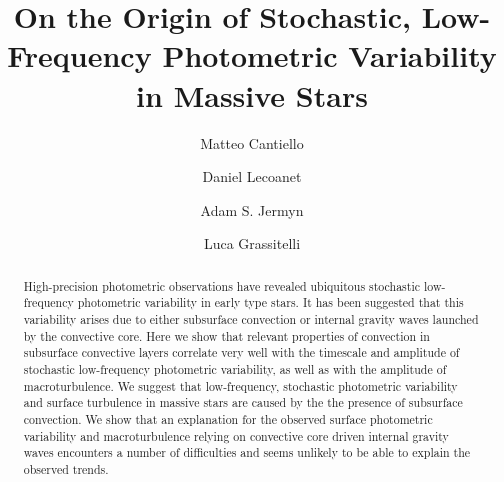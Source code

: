 \documentclass[twocolumn]{aastex63}
\begin{document}
\title{On the Origin of Stochastic, Low-Frequency Photometric Variability in Massive Stars}


\author[0000-0002-8171-8596]{Matteo Cantiello}
\affiliation{}

\author[0000-0002-7635-9728]{Daniel Lecoanet}

\author[0000-0001-5048-9973]{Adam S. Jermyn}
\affiliation{}


\author[0000-0001-9324-3359]{Luca Grassitelli}




\begin{abstract}
High-precision photometric observations have revealed ubiquitous stochastic low-frequency photometric variability in early type stars.
It has been suggested that this variability arises due to either subsurface convection or internal gravity waves launched by the convective core.
Here we show that relevant properties of convection in subsurface convective layers correlate very well with the timescale and amplitude of stochastic low-frequency photometric variability, as well as with the amplitude of macroturbulence.
We suggest that low-frequency, stochastic photometric variability and surface turbulence in massive stars are caused by the the presence of subsurface convection.
We show that an explanation for the observed surface photometric variability and macroturbulence relying on convective core driven internal gravity waves encounters a number of difficulties and seems unlikely to be able to explain the observed trends.

\end{abstract}

\end{document}
